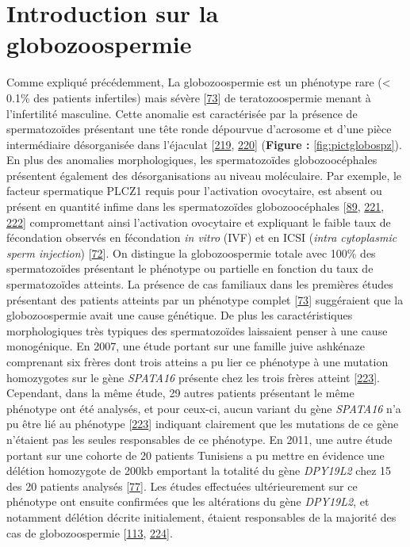 \documentclass[12pt,a4paper,twoside]{ugathesis}
\theoremstyle{definition}
\theoremstyle{definition}
\theoremstyle{definition}
\theoremstyle{remark}
\begin{document}
\newpage 

\section{Introduction sur la
globozoospermie}\label{introduction-sur-la-globozoospermie}

Comme expliqué précédemment, La globozoospermie est un phénotype rare
(\textless{} 0.1\% des patients infertiles) mais sévère
{[}\protect\hyperlink{ref-Sen2009}{73}{]} de teratozoospermie menant à
l'infertilité masculine. Cette anomalie est caractérisée par la présence
de spermatozoïdes présentant une tête ronde dépourvue d'acrosome et
d'une pièce intermédiaire désorganisée dans l'éjaculat
{[}\protect\hyperlink{ref-Singh}{219},
\protect\hyperlink{ref-Pedersen1974}{220}{]} (\textbf{Figure :
}\ref{fig:pictglobospz}). En plus des anomalies morphologiques, les
spermatozoïdes globozoocéphales présentent également des
désorganisations au niveau moléculaire. Par exemple, le facteur
spermatique PLCZ1 requis pour l'activation ovocytaire, est absent ou
présent en quantité infime dans les spermatozoïdes globozoocéphales
{[}\protect\hyperlink{ref-Heytens2009}{89},
\protect\hyperlink{ref-Taylor2010}{221},
\protect\hyperlink{ref-Yoon2008}{222}{]} compromettant ainsi
l'activation ovocytaire et expliquant le faible taux de fécondation
observés en fécondation \emph{in vitro} (IVF) et en ICSI (\emph{intra
cytoplasmic sperm injection}) {[}\protect\hyperlink{ref-Dam2006}{72}{]}.
On distingue la globozoospermie totale avec 100\% des spermatozoïdes
présentant le phénotype ou partielle en fonction du taux de
spermatozoïdes atteints. La présence de cas familiaux dans les premières
études présentant des patients atteints par un phénotype complet
{[}\protect\hyperlink{ref-Sen2009}{73}{]} suggéraient que la
globozoospermie avait une cause génétique. De plus les caractéristiques
morphologiques très typiques des spermatozoïdes laissaient penser à une
cause monogénique. En 2007, une étude portant sur une famille juive
ashkénaze comprenant six frères dont trois atteins a pu lier ce
phénotype à une mutation homozygotes sur le gène \emph{SPATA16} présente
chez les trois frères atteint
{[}\protect\hyperlink{ref-Dam2007}{223}{]}. Cependant, dans la même
étude, 29 autres patients présentant le même phénotype ont été analysés,
et pour ceux-ci, aucun variant du gène \emph{SPATA16} n'a pu être lié au
phénotype {[}\protect\hyperlink{ref-Dam2007}{223}{]} indiquant
clairement que les mutations de ce gène n'étaient pas les seules
responsables de ce phénotype. En 2011, une autre étude portant sur une
cohorte de 20 patients Tunisiens a pu mettre en évidence une délétion
homozygote de 200kb emportant la totalité du gène \emph{DPY19L2} chez 15
des 20 patients analysés {[}\protect\hyperlink{ref-Harbuz2011}{77}{]}.
Les études effectuées ultérieurement sur ce phénotype ont ensuite
confirmées que les altérations du gène \emph{DPY19L2}, et notamment
délétion décrite initialement, étaient responsables de la majorité des
cas de globozoospermie {[}\protect\hyperlink{ref-ElInati2012}{113},
\protect\hyperlink{ref-Ray2011}{224}{]}.
\end{document}
